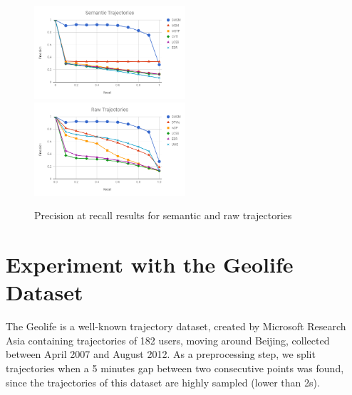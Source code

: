 \begin{figure}[ht!]
\centering
\centerline{
\includegraphics[width=0.5\textwidth]{Images/new_P_R-chart_San_Francisco.png}
\includegraphics[width=0.5\textwidth]{Images/new_P_R-chart_San_Francisco-raw.png}
}
\caption{ Precision at recall results for semantic and raw trajectories}
\label{fig:new_sanfrancisco_precision_recall}
\end{figure}


\section{Experiment with the Geolife Dataset}\label{sec:geolife}

The Geolife is a well-known trajectory dataset, created by Microsoft Research Asia \cite{zheng2009mining} containing trajectories of 182 users, moving around Beijing, collected between April 2007 and August 2012. As a preprocessing step, we split trajectories when a 5 minutes gap between two consecutive points was found, since the trajectories of this dataset are highly sampled (lower than 2s).

